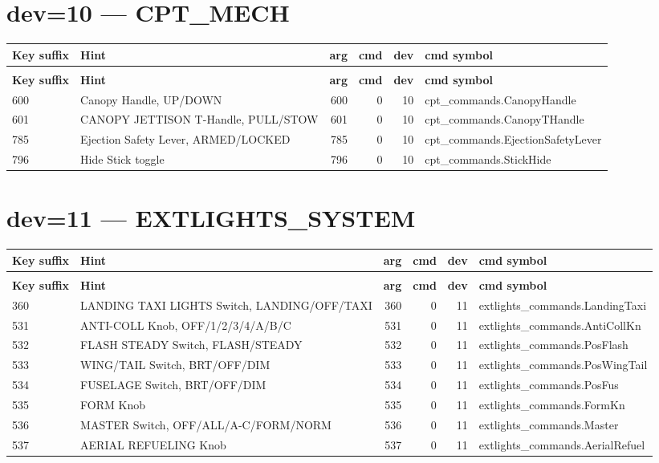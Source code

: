 \documentclass[10pt,a4paper]{article}
\begin{document}
\section{dev=10 — CPT\_MECH}
\begin{longtable}{>{\ttfamily\small}p{38mm} >{\small}p{72mm} r r r >{\ttfamily\small}p{48mm}}
\toprule
\textbf{Key suffix} & \textbf{Hint} & \textbf{arg} & \textbf{cmd} & \textbf{dev} & \textbf{cmd symbol} \\
\midrule
\endfirsthead
\multicolumn{6}{l}{\small\itshape continued\ldots}\\
\toprule
\textbf{Key suffix} & \textbf{Hint} & \textbf{arg} & \textbf{cmd} & \textbf{dev} & \textbf{cmd symbol} \\
\midrule
\endhead
\bottomrule
\endfoot
\rowcolor{rowodd}
  600 & Canopy Handle, UP/DOWN & 600 & 0 & 10 & cpt\_commands.CanopyHandle \\
  601 & CANOPY JETTISON T-Handle, PULL/STOW & 601 & 0 & 10 & cpt\_commands.CanopyTHandle \\
\rowcolor{rowodd}
  785 & Ejection Safety Lever, ARMED/LOCKED & 785 & 0 & 10 & cpt\_commands.EjectionSafetyLever \\
  796 & Hide Stick toggle & 796 & 0 & 10 & cpt\_commands.StickHide \\
\end{longtable}
\section{dev=11 — EXTLIGHTS\_SYSTEM}
\begin{longtable}{>{\ttfamily\small}p{38mm} >{\small}p{72mm} r r r >{\ttfamily\small}p{48mm}}
\toprule
\textbf{Key suffix} & \textbf{Hint} & \textbf{arg} & \textbf{cmd} & \textbf{dev} & \textbf{cmd symbol} \\
\midrule
\endfirsthead
\multicolumn{6}{l}{\small\itshape continued\ldots}\\
\toprule
\textbf{Key suffix} & \textbf{Hint} & \textbf{arg} & \textbf{cmd} & \textbf{dev} & \textbf{cmd symbol} \\
\midrule
\endhead
\bottomrule
\endfoot
\rowcolor{rowodd}
  360 & LANDING TAXI LIGHTS Switch, LANDING/OFF/TAXI & 360 & 0 & 11 & extlights\_commands.LandingTaxi \\
  531 & ANTI-COLL Knob, OFF/1/2/3/4/A/B/C & 531 & 0 & 11 & extlights\_commands.AntiCollKn \\
\rowcolor{rowodd}
  532 & FLASH STEADY Switch, FLASH/STEADY & 532 & 0 & 11 & extlights\_commands.PosFlash \\
  533 & WING/TAIL Switch, BRT/OFF/DIM & 533 & 0 & 11 & extlights\_commands.PosWingTail \\
\rowcolor{rowodd}
  534 & FUSELAGE Switch, BRT/OFF/DIM & 534 & 0 & 11 & extlights\_commands.PosFus \\
  535 & FORM Knob & 535 & 0 & 11 & extlights\_commands.FormKn \\
\rowcolor{rowodd}
  536 & MASTER Switch, OFF/ALL/A-C/FORM/NORM & 536 & 0 & 11 & extlights\_commands.Master \\
  537 & AERIAL REFUELING Knob & 537 & 0 & 11 & extlights\_commands.AerialRefuel \\
\end{longtable}
\end{document}
